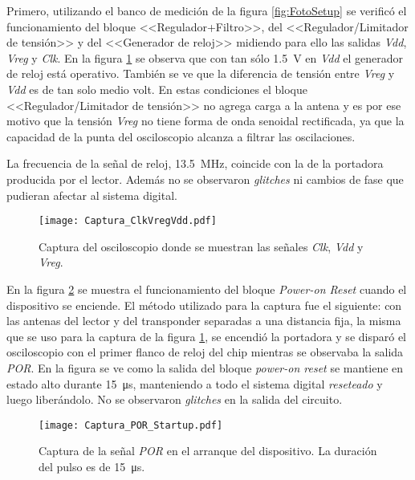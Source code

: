 Primero, utilizando el banco de medición de la figura 
\ref{fig:FotoSetup} se verificó el funcionamiento del bloque 
<<Regulador+Filtro>>, del <<Regulador/Limitador de tensión>>  y del 
<<Generador de reloj>> midiendo para ello las salidas \emph{Vdd}, 
\emph{Vreg} y \emph{Clk}. En la figura \ref{fig:CapturaClkVregVdd} se 
observa que con tan sólo \SI{1.5}{\volt} en \emph{Vdd} el generador de 
reloj está operativo. También se ve que la diferencia de tensión 
entre \emph{Vreg} y \emph{Vdd} es de tan solo medio volt. En estas 
condiciones el bloque <<Regulador/Limitador de tensión>> no  
agrega carga a la antena y es por ese motivo que la tensión 
\emph{Vreg} no tiene forma de onda senoidal rectificada, ya que la 
capacidad de la punta del osciloscopio alcanza a filtrar las 
oscilaciones.

La frecuencia de la señal de reloj, \SI{13.5}{\mega\hertz}, coincide 
con la de la portadora producida por el lector. Además  
no se observaron \emph{glitches} ni cambios de fase que pudieran 
afectar al sistema digital.

\begin{figure}
	\centering
	\texttt{[image: Captura\_ClkVregVdd.pdf]}
	\caption{Captura del osciloscopio donde se muestran las señales 
	\emph{Clk}, \emph{Vdd} y \emph{Vreg}.}
	\label{fig:CapturaClkVregVdd}
\end{figure}

En la figura \ref{fig:CapturaPORStartup} se muestra el 
funcionamiento del bloque \emph{Power-on Reset} cuando el dispositivo 
se enciende. El método utilizado para la captura fue el siguiente: con 
las antenas del lector y del transponder separadas a una distancia 
fija, la misma que se uso para la captura de la figura 
\ref{fig:CapturaClkVregVdd}, se encendió la portadora y se disparó el 
osciloscopio con el primer flanco de reloj del chip mientras se 
observaba la salida \emph{POR}. En la figura se ve como la salida del 
bloque \emph{power-on reset} se mantiene en estado alto durante 
\SI{15}{\micro\second}, manteniendo a todo el sistema digital 
\emph{reseteado} y luego liberándolo. No se observaron \emph{glitches} 
en la salida del circuito.

\begin{figure}
	\centering
	\texttt{[image: Captura\_POR\_Startup.pdf]}
	\caption{Captura de la señal \emph{POR} en el 
	arranque del dispositivo. La duración del pulso es de 
	\SI{15}{\micro\second}.}
	\label{fig:CapturaPORStartup}
\end{figure}

